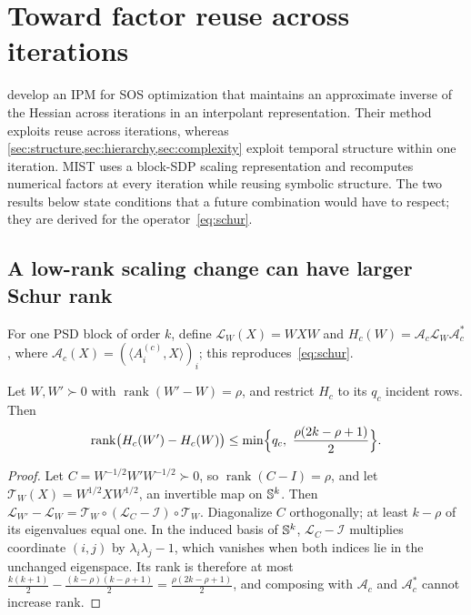 \section{Toward factor reuse across iterations}\label{app:inverse}

\citet{jiang2022sos} develop an IPM for SOS optimization that maintains an
approximate inverse of the Hessian across iterations in an interpolant
representation. Their method exploits reuse across iterations, whereas
\cref{sec:structure,sec:hierarchy,sec:complexity} exploit temporal structure
within one iteration. MIST uses a block-SDP scaling representation and
recomputes numerical factors at every iteration while reusing symbolic
structure. The two results below state conditions that a future combination
would have to respect; they are derived for the operator~\eqref{eq:schur}.

\subsection{A low-rank scaling change can have larger Schur rank}

For one PSD block of order $k$, define $\mathcal L_W(X)=WXW$ and
$H_c(W)=\mathcal A_c\mathcal L_W\mathcal A_c^*$, where
$\mathcal A_c(X)=(\langle A_i^{(c)},X\rangle)_i$; this reproduces~\eqref{eq:schur}.

\begin{proposition}\label{prop:rank}
Let $W,W'\succ0$ with $\operatorname{rank}(W'-W)=\rho$, and restrict $H_c$ to its
$q_c$ incident rows. Then
\begin{equation}\label{eq:rank}
\operatorname{rank}\bigl(H_c(W')-H_c(W)\bigr)\le\min\Bigl\{q_c,\ \frac{\rho(2k-\rho+1)}2\Bigr\}.
\end{equation}
\end{proposition}

\begin{proof}
Let $C=W^{-1/2}W'W^{-1/2}\succ0$, so $\operatorname{rank}(C-I)=\rho$, and let
$\mathcal T_W(X)=W^{1/2}XW^{1/2}$, an invertible map on $\mathbb S^k$. Then
$\mathcal L_{W'}-\mathcal L_W=\mathcal T_W\circ(\mathcal L_C-\mathcal I)\circ\mathcal T_W$.
Diagonalize $C$ orthogonally; at least $k-\rho$ of its eigenvalues equal one. In
the induced basis of $\mathbb S^k$, $\mathcal L_C-\mathcal I$ multiplies coordinate
$(i,j)$ by $\lambda_i\lambda_j-1$, which vanishes when both indices lie in the
unchanged eigenspace. Its rank is therefore at most
$\frac{k(k+1)}2-\frac{(k-\rho)(k-\rho+1)}2=\frac{\rho(2k-\rho+1)}2$, and
composing with $\mathcal A_c$ and $\mathcal A_c^*$ cannot increase rank.
\end{proof}


